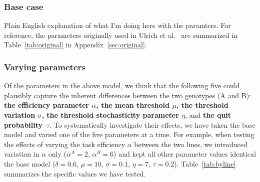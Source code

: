 \documentclass[11pt]{article}
\begin{document}
\subsubsection{Base case}   
{\color{red}Plain English explanation of what I'm doing here with the paramters}. 
For reference, the parameters originally used in Ulrich et al.~\cite{ulrich2018} are summarized in Table~\ref{tab:original} in Appendix~\ref{sec:original}.

\subsubsection{Varying parameters} 

Of the parameters in the above model, we think that the following five could plausibly capture the inherent differences between the two genotypes (A and B): \textbf{the efficiency parameter $\alpha$, the mean threshold $\mu$, the threshold variation $\sigma$, the threshold stochasticity parameter $\eta$}, and \textbf{the quit probability~$\tau$}. To systematically investigate their effects, we have taken the base model and varied one of the five parameters at a time. For example, when testing the effects of varying the task efficiency $\alpha$ between the two lines, we introduced variation in $\alpha$ only ($\alpha^A = 2$, $\alpha^B = 6$) and kept all other parameter values identical the base model ($\delta = 0.6$, $\mu = 10$, $\sigma = 0.1$, $\eta = 7$, $\tau = 0.2$). Table~\ref{tab:byline} summarizes the specific values we have tested. 
\end{document}
